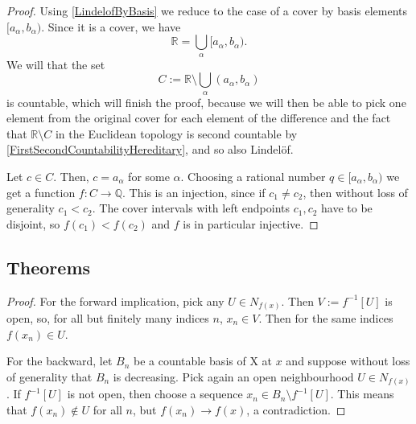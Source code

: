 \begin{proof}
    Using \ref{LindelofByBasis} we reduce to the case of a cover by basis elements \( [a_\alpha, b_\alpha) \). Since it is a cover, we have
    \[ 
        \mathbb{R} = \bigcup_{\alpha} [a_\alpha, b_\alpha).
   \]
   We will that the set
   \[ 
       C := \mathbb{R} \setminus \bigcup_{\alpha} (a_\alpha, b_\alpha) 
  \]
  is countable, which will finish the proof, because we will then be able to pick one element from the original cover for each element of the difference and the fact that \( \mathbb{R} \setminus C \) in the Euclidean topology is second countable by \ref{FirstSecondCountabilityHereditary}, and so also Lindel\"of.

  Let \( c \in C \). Then, \( c = a_\alpha \) for some \( \alpha \). Choosing a rational number \( q \in [a_\alpha, b_\alpha) \) we get a function \( f: C \to \mathbb{Q} \). This is an injection, since if \( c_1 \neq c_2 \), then without loss of generality \( c_1 < c_2 \). The cover intervals with left endpoints \( c_1, c_2 \) have to be disjoint, so \( f(c_1) < f(c_2) \) and \( f \) is in particular injective.
\end{proof}

\subsection{Theorems}


\begin{proof} 
    For the forward implication, pick any \( U \in N_{f(x)} \). Then \( V := f^{-1}[U] \) is open, so, for all but finitely many indices \( n \), \( x_n \in V \). Then for the same indices \( f(x_n) \in U \).

    For the backward, let \( B_n \) be a countable basis of X at \( x \) and suppose without loss of generality that \( B_n \) is decreasing. Pick again an open neighbourhood \( U \in N_{f(x)} \). If \( f^{-1}[U] \) is not open, then choose a sequence \( x_n \in B_n \setminus f^{-1}[U] \). This means that \( f(x_n) \not\in U \) for all \( n \), but \( f(x_n) \to f(x) \), a contradiction.
\end{proof}

